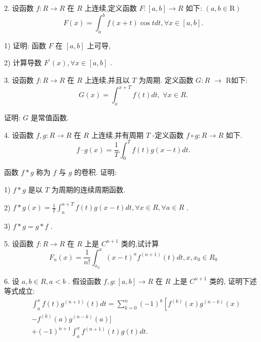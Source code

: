 2. 设函数 $f : R \rightarrow  R$ 在 $R$ 上连续,定义函数 $F : \left\lbrack  {a,b}\right\rbrack   \rightarrow  R$ 如下: $\left( {a,b \in  \mathrm{R}}\right)$
$$F\left( x\right)  = {\int }_{a}^{b}f\left( {x + t}\right) \cos {tdt},\forall x \in  \left\lbrack  {a,b}\right\rbrack  .$$

1) 证明: 函数 $F$ 在 $\left\lbrack  {a,b}\right\rbrack$ 上可导,

2) 计算导数 ${F}^{\prime }\left( x\right) ,\forall x \in  \left\lbrack  {a,b}\right\rbrack$ .

3. 设函数 $f : R \rightarrow  R$ 在 $R$ 上连续,并且以 $T$ 为周期. 定义函数 $G : R$  $\rightarrow$ R如下:
$$G\left( x\right)  = {\int }_{x}^{x + T}f\left( t\right) {dt},\;\forall x \in  R.$$

证明: $G$ 是常值函数.

4. 设函数 $f,g : R \rightarrow  R$ 在 $R$ 上连续,并有周期 $T$ -定义函数 $f \circ  g : R \rightarrow  R$ 如下.
$$f \cdot  g\left( x\right)  = \frac{1}{T}{\int }_{0}^{T}f\left( t\right) g\left( {x - t}\right) {dt}.$$

函数 $f * g$ 称为 $f$ 与 $g$ 的卷积. 证明:

1) $f * g$ 是以 $T$ 为周期的连续周期函数.

2) $f * g\left( x\right)  = \frac{1}{T}{\int }_{a}^{a + T}f\left( t\right) g\left( {x - t}\right) {dt},\forall x \in  R,\forall a \in  R$ .

3) $f * g = g * f$ .

5. 设函数 $f : R \rightarrow  R$ 在 $R$ 上是 ${C}^{n + 1}$ 类的,试计算
$${F}_{n}\left( x\right)  = \frac{1}{n!}{\int }_{{x}_{0}}^{x}{\left( x - t\right) }^{n}{f}^{\left( n + 1\right) }\left( t\right) {dt},x,{x}_{0} \in  {R}_{0}$$

6. 设 $a,b \in  R,a < b$ . 假设函数 $f,g : \left\lbrack  {a,b}\right\rbrack   \rightarrow  R$ 在 $R$ 上是 ${C}^{n + 1}$ 类的, 证明下述等式成立:
\begin{align*}
	&{\int }_{a}^{x}f\left( t\right) {g}^{\left( n + 1\right) }\left( t\right) {dt} = \mathop{\sum }\limits_{{k = 0}}^{n}{\left( -1\right) }^{k}\left\lbrack  {{f}^{\left( k\right) }\left( x\right) {g}^{\left( n - k\right) }\left( x\right) }\right.\\
	&- {f}^{\left( k\right) }\left( a\right) {g}^{\left( n - k\right) }\left( a\right) \rbrack\\
	&+ {\left( -1\right) }^{n + 1}{\int }_{a}^{x}{f}^{\left( n + 1\right) }\left( t\right) g\left( t\right) {dt}.
\end{align*}


